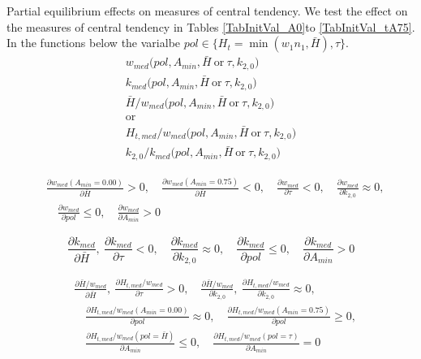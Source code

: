 \documentclass[letterpaper,12pt]{article}
\theoremstyle{definition}
\begin{document}
\begin{spacing}{1.5}
  Partial equilibrium effects on measures of central tendency. We test the effect on the measures of central tendency in Tables \ref{TabInitVal_A0}to \ref{TabInitVal_tA75}. In the functions below the varialbe $pol\in\{H_t=\min(w_1 n_1,\bar{H}), \tau\}$.
  \begin{gather*}
    w_{med}\bigl(pol, A_{min}, \bar{H} \:\text{or}\: \tau, k_{2,0}\bigr) \\
    k_{med}\bigl(pol, A_{min}, \bar{H} \:\text{or}\: \tau, k_{2,0}\bigr) \\
    \bar{H}/w_{med}\bigl(pol, A_{min}, \bar{H} \:\text{or}\: \tau, k_{2,0}\bigr) \\
    \text{or} \\
    H_{t,med}/w_{med}\bigl(pol, A_{min}, \bar{H} \:\text{or}\: \tau, k_{2,0}\bigr) \\
    k_{2,0}/k_{med}\bigl(pol, A_{min}, \bar{H} \:\text{or}\: \tau, k_{2,0}\bigr)
  \end{gather*}

  \begin{equation*}
    \begin{split}
      &\frac{\partial w_{med}(A_{min}=0.00)}{\partial\bar{H}}>0, \quad \frac{\partial w_{med}(A_{min}=0.75)}{\partial\bar{H}}<0, \quad \frac{\partial w_{med}}{\partial\tau}<0, \quad \frac{\partial w_{med}}{\partial k_{2,0}}\approx 0, \\
      &\quad \frac{\partial w_{med}}{\partial pol}\leq0, \quad \frac{\partial w_{med}}{\partial A_{min}}>0
    \end{split}
  \end{equation*}

  \begin{equation*}
    \frac{\partial k_{med}}{\partial\bar{H}},\:\frac{\partial k_{med}}{\partial\tau}<0, \quad \frac{\partial k_{med}}{\partial k_{2,0}}\approx 0, \quad \frac{\partial k_{med}}{\partial pol}\leq0, \quad \frac{\partial k_{med}}{\partial A_{min}}>0
  \end{equation*}

  \begin{equation*}
    \begin{split}
      &\frac{\partial\bar{H}/w_{med}}{\partial\bar{H}},\:\frac{\partial H_{t,med}/w_{med}}{\partial\tau}>0, \quad \frac{\partial\bar{H}/w_{med}}{\partial k_{2,0}},\:\frac{\partial H_{t,med}/w_{med}}{\partial k_{2,0}}\approx 0, \\
      &\quad \frac{\partial H_{t,med}/w_{med}(A_{min}=0.00)}{\partial pol}\approx 0, \quad \frac{\partial H_{t,med}/w_{med}(A_{min}=0.75)}{\partial pol}\geq 0, \\
      &\quad \frac{\partial H_{t,med}/w_{med}(pol=\bar{H})}{\partial A_{min}}\leq 0, \quad \frac{\partial H_{t,med}/w_{med}(pol=\tau)}{\partial A_{min}}= 0
    \end{split}
  \end{equation*}


\end{spacing}
\end{document}
